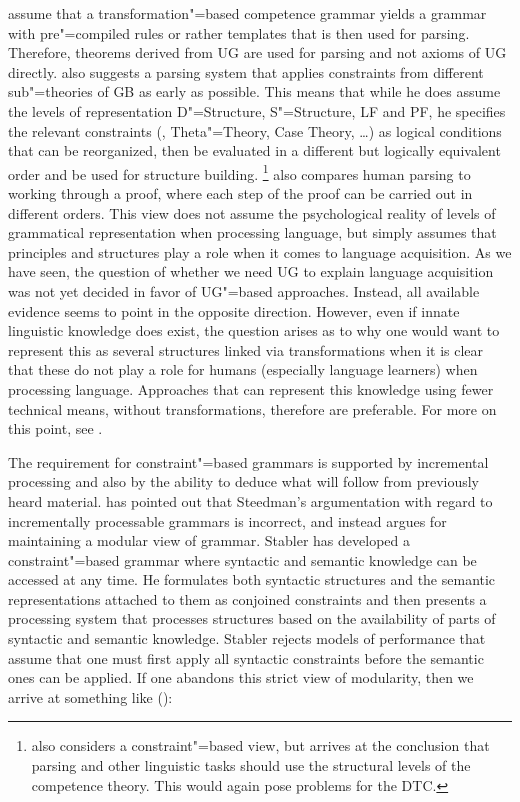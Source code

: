 \citet[]{FC96a-u} assume that a transformation"=based competence grammar yields a grammar with pre"=compiled
rules or rather templates that is then used for parsing.
Therefore, theorems derived from UG are used for parsing and not axioms of UG directly.
\citet{Johnson89a} also suggests a parsing system that applies constraints from different sub"=theories of GB as early as possible.
This means that while he does assume the levels of representation D"=Structure, S"=Structure, LF and PF, he specifies the relevant
constraints (\xbart, Theta"=Theory, Case Theory, \ldots) as logical
conditions that can be reorganized, then be evaluated in a different but logically
equivalent order and be used for structure building.%
\footnote{%
\citet[Section~15.7]{Stabler92a-u} also considers a constraint"=based view, but arrives at the conclusion that parsing and other linguistic
tasks should use the structural levels of the competence theory. This would again pose problems for the DTC.%
}
\citet[]{Chomsky2007a} also compares human parsing to working through a proof, where each step of the proof can be carried out in different
orders. This view does not assume the psychological reality of levels of grammatical representation when processing language, but simply assumes
that principles and structures play a role when it comes to language acquisition. 
As we have seen, the question of whether we need UG to explain language acquisition was not yet decided in favor of UG"=based approaches.
Instead, all available evidence seems to point in the opposite direction. However, even if innate linguistic knowledge does exist, the
question arises as to why one would want to represent this as several structures linked via transformations when it is clear that these do not play
a role for humans (especially language learners) when processing language.
Approaches that can represent this knowledge using fewer technical means, \eg without transformations, therefore are preferable.
For more on this point, see .

The requirement for constraint"=based grammars is supported by incremental processing and also by
the ability to deduce what will follow from previously heard material. \cite{Stabler91a} has pointed
out that Steedman's argumentation with regard to incrementally
processable grammars is incorrect, and instead argues for maintaining a modular view of
grammar. Stabler has developed a constraint"=based grammar where syntactic and semantic
knowledge can be accessed at any time. He formulates both syntactic structures and the semantic
representations attached to them as conjoined constraints and then presents a processing system
that processes structures based on the availability of parts of syntactic and semantic
knowledge. Stabler rejects models of performance that assume that one must first apply all syntactic
constraints before the semantic ones can be applied. If one abandons this strict view of modularity,
then we arrive at something like ():

